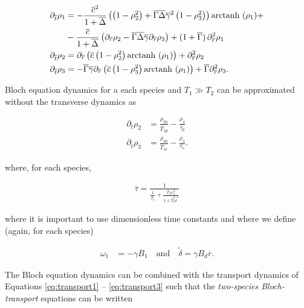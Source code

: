 \documentclass[%
oneside,                 %
final,                   %
10pt]{article}
\begin{document}
\begin{align} 
	\partial_{\overline{t}} \rho_1 
	&=
	-\frac{\overline{c}^2}{1+\overline{\Delta}}
	\left(
		\left(
			1 - \rho_2^2
		\right)
		+
		\overline{\Gamma}\overline{\Delta}\overline{\gamma}^2
		\left(
			1 - \rho_3^2
		\right)
	\right)
	\text{arctanh }(\rho_1) + 
	\nonumber\\
	&-\frac{\overline{c}}{1+\overline{\Delta}}
	\left(
		\partial_{\overline{r}} \rho_2 - \overline{\Gamma}\overline{\Delta}\overline{\gamma} \partial_{\overline{r}} \rho_3
	\right)
	+ ( 1 + \overline{\Gamma} )\, \partial_{\overline{r}}^2 \rho_1
	\label{eq:transport1} \\
	\partial_{\overline{t}} \rho_2 
	&=
	\partial_{\overline{r}}
	\left(
		\overline{c}
		\left( 1 - \rho_2^2 \right)
		\text{arctanh }(\rho_1)
	\right)
	+ \partial_{\overline{r}}^2 \rho_2
	\label{eq:transport2} \\
	\partial_{\overline{t}} \rho_3
	&=
	- 
	\overline{\Gamma}\overline{\gamma}
	\partial_{\overline{r}}
	\left(
		\overline{c}
		\left( 1 - \rho_3^2 \right)
		\text{arctanh }(\rho_1)
	\right)
	+ \overline{\Gamma} \partial_{\overline{r}}^2 \rho_3 .
	\label{eq:transport3}
\end{align}

Bloch equation dynamics for a each species and $T_1 \gg T_2$ can be approximated without the transverse dynamics as \cite{Picone2010,Grivet1993}

\begin{align}
	\partial_{\overline{t}} \rho_2 &= \frac{\rho_{20}}{\overline{T}_{1p}} - \frac{\rho_2}{\overline{\tau}_p} \\
	\partial_{\overline{t}} \rho_3 &= \frac{\rho_{30}}{\overline{T}_{1e}} - \frac{\rho_3}{\overline{\tau}_e}.
\end{align}

where, for each species,

\begin{align}
	\overline{\tau} = \frac{1}{\frac{1}{\overline{T}_1} + \frac{\overline{T}_2 \omega_1^2}{1+\overline{T}_2^2 \tilde{\delta}^2}}
\end{align}

where it is important to use dimensionless time constants and where we define (again, for each species)

\begin{align}
	\omega_1 &= -\gamma B_1 \quad \text{and} \quad
	\tilde{\delta} = \gamma B_d \overline{r}.
\end{align}

The Bloch equation dynamics can be combined with the transport dynamics of Equations \ref{eq:transport1} -- \ref{eq:transport3} such that the \emph{two-species Bloch-transport} equations can be written
\end{document}

